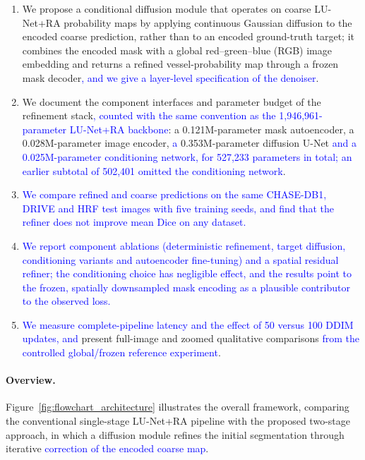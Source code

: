 \documentclass[jimaging,article,submit,pdftex,moreauthors]
  {Definitions/mdpi}
\DeclareRobustCommand{\rev}[1]{\textcolor{blue}{#1}}
\DeclareRobustCommand{\rev}[1]{#1}
\providecommand{\linelabel}[1]{}
\newcommand{\secend}[1]{\linelabel{rev:end:#1}}
\begin{document}
\begin{enumerate}

  \item We propose a conditional diffusion module that operates on
coarse LU-Net+RA probability maps by applying continuous Gaussian diffusion to
the encoded coarse prediction, rather than to an encoded ground-truth target;
it combines the encoded mask with a global red--green--blue (RGB) image
embedding and returns a refined vessel-probability map through a frozen mask
decoder\rev{, and we give a layer-level specification of the denoiser}.

  \item We document the component interfaces and parameter budget of the refinement stack\rev{, counted with the same convention as the 1,946,961-parameter LU-Net+RA backbone}: a 0.121M-parameter mask autoencoder, a 0.028M-parameter image encoder, \rev{a} 0.353M-parameter diffusion U-Net \rev{and a 0.025M-parameter conditioning network, for 527,233 parameters in total; an earlier subtotal of 502,401 omitted the conditioning network}.

  \item \rev{We compare refined and coarse predictions on the same CHASE-DB1, DRIVE and HRF test images with five training seeds, and find that the refiner does not improve mean Dice on any dataset.}

  \item \rev{We report component ablations (deterministic refinement, target diffusion, conditioning variants and autoencoder fine-tuning) and a spatial residual refiner; the conditioning choice has negligible effect, and the results point to the frozen, spatially downsampled mask encoding as a plausible contributor to the observed loss.}

  \item \rev{We measure complete-pipeline latency and the effect of 50 versus 100 DDIM updates, and} present full-image and zoomed qualitative comparisons \rev{from the controlled global/frozen reference experiment}.
\end{enumerate}
\secend{contributions}

\paragraph{Overview.}
Figure~\ref{fig:flowchart_architecture} illustrates the overall framework, comparing the conventional single-stage LU-Net+RA pipeline with the proposed two-stage approach, in which a diffusion module refines the initial segmentation through iterative \rev{correction of the encoded coarse map}.
\end{document}
